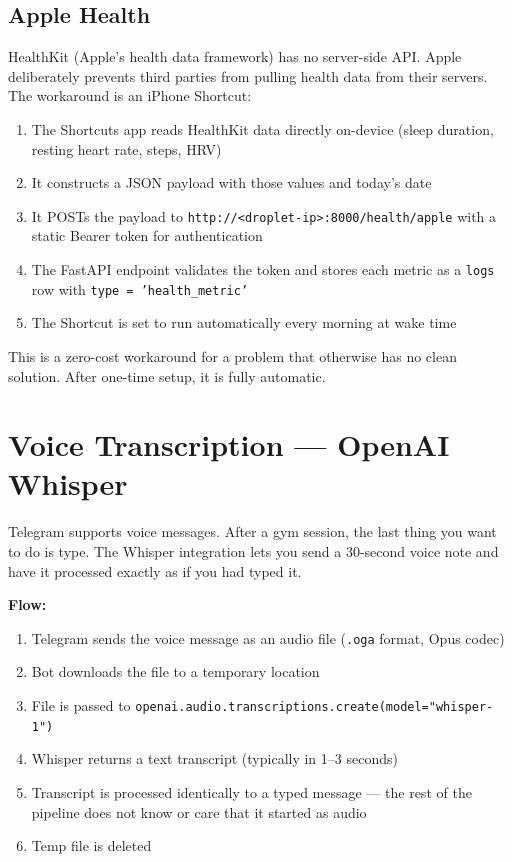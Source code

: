 \documentclass[12pt, a4paper]{article}
\begin{document}
\subsection{Apple Health}

HealthKit (Apple's health data framework) has no server-side API. Apple deliberately prevents third parties from pulling health data from their servers. The workaround is an iPhone Shortcut:

\begin{enumerate}[noitemsep]
    \item The Shortcuts app reads HealthKit data directly on-device (sleep duration, resting heart rate, steps, HRV)
    \item It constructs a JSON payload with those values and today's date
    \item It POSTs the payload to \texttt{http://<droplet-ip>:8000/health/apple} with a static Bearer token for authentication
    \item The FastAPI endpoint validates the token and stores each metric as a \texttt{logs} row with \texttt{type = 'health\_metric'}
    \item The Shortcut is set to run automatically every morning at wake time
\end{enumerate}

This is a zero-cost workaround for a problem that otherwise has no clean solution. After one-time setup, it is fully automatic.

\section{Voice Transcription --- OpenAI Whisper}

Telegram supports voice messages. After a gym session, the last thing you want to do is type. The Whisper integration lets you send a 30-second voice note and have it processed exactly as if you had typed it.

\textbf{Flow:}
\begin{enumerate}[noitemsep]
    \item Telegram sends the voice message as an audio file (\texttt{.oga} format, Opus codec)
    \item Bot downloads the file to a temporary location
    \item File is passed to \texttt{openai.audio.transcriptions.create(model="whisper-1")}
    \item Whisper returns a text transcript (typically in 1--3 seconds)
    \item Transcript is processed identically to a typed message --- the rest of the pipeline does not know or care that it started as audio
    \item Temp file is deleted
\end{enumerate}
\end{document}
